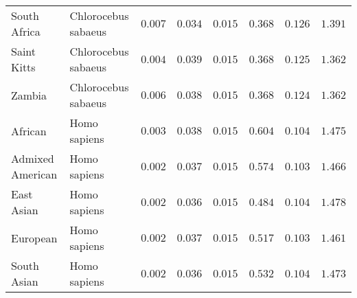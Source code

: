 \documentclass{article}
\begin{document}
\begin{center}
\begin{longtable}{|l|l|r|r|r|r|r|r|}
            South Africa         & Chlorocebus sabaeus & $ 0.007$        & $ 0.034$                   & $ 0.015$                      & $ 0.368$                             & $ 0.126$                      & $ 1.391$           \\
            Saint Kitts          & Chlorocebus sabaeus & $ 0.004$        & $ 0.039$                   & $ 0.015$                      & $ 0.368$                             & $ 0.125$                      & $ 1.362$           \\
            Zambia               & Chlorocebus sabaeus & $ 0.006$        & $ 0.038$                   & $ 0.015$                      & $ 0.368$                             & $ 0.124$                      & $ 1.362$           \\
            African              & Homo sapiens        & $ 0.003$        & $ 0.038$                   & $ 0.015$                      & $ 0.604$                             & $ 0.104$                      & $ 1.475$           \\
            Admixed American     & Homo sapiens        & $ 0.002$        & $ 0.037$                   & $ 0.015$                      & $ 0.574$                             & $ 0.103$                      & $ 1.466$           \\
            East Asian           & Homo sapiens        & $ 0.002$        & $ 0.036$                   & $ 0.015$                      & $ 0.484$                             & $ 0.104$                      & $ 1.478$           \\
            European             & Homo sapiens        & $ 0.002$        & $ 0.037$                   & $ 0.015$                      & $ 0.517$                             & $ 0.103$                      & $ 1.461$           \\
            South Asian          & Homo sapiens        & $ 0.002$        & $ 0.036$                   & $ 0.015$                      & $ 0.532$                             & $ 0.104$                      & $ 1.473$           \\
        \end{longtable}
    \end{center}
\end{document}
